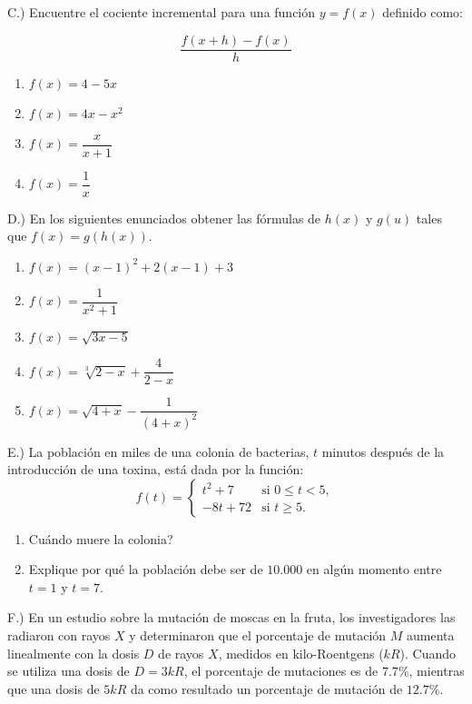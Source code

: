 \documentclass[]{book}
\providecommand{\tightlist}{%
  \setlength{\itemsep}{0pt}\setlength{\parskip}{0pt}}
\theoremstyle{definition}
\theoremstyle{definition}
\theoremstyle{definition}
\theoremstyle{remark}
\begin{document}
C.) Encuentre el cociente incremental para una función \(y=f(x)\) definido como:

\[
\dfrac{f(x+h)-f(x)}{h}
\]

\begin{enumerate}
\def\labelenumi{\alph{enumi}.}
\tightlist
\item
  \(f(x)=4-5x\)
\item
  \(f(x)=4x-x^{2}\)
\item
  \(f(x)=\dfrac{x}{x+1}\)
\item
  \(f(x)=\dfrac{1}{x}\)
\end{enumerate}

D.) En los siguientes enunciados obtener las fórmulas de \(h(x)\) y \(g(u)\) tales que \(f(x)=g(h(x))\).

\begin{enumerate}
\def\labelenumi{\alph{enumi}.}
\item
  \(f(x)=(x-1)^{2}+2(x-1)+3\)
\item
  \(f(x)=\dfrac{1}{x^{2}+1}\)
\item
  \(f(x)=\sqrt{3x-5}\)
\item
  \(f(x)=\sqrt[3]{2-x}+\dfrac{4}{2-x}\)
\item
  \(f(x)=\sqrt{4+x}-\dfrac{1}{(4+x)^{2}}\)
\end{enumerate}

E.) La población en miles de una colonia de bacterias, \(t\) minutos después de la introducción de una toxina, está dada por la función:
\[
f(t)=\begin{cases}
t^{2}+7 & \text{si $0 \leqslant t < 5$},\\
-8t+72 & \text{si $t \geq 5$}.
\end{cases} 
\]

\begin{enumerate}
\def\labelenumi{\alph{enumi}.}
\tightlist
\item
  Cuándo muere la colonia?
\item
  Explique por qué la población debe ser de \(10.000\) en algún momento entre \(t=1\) y \(t=7\).
\end{enumerate}

F.) En un estudio sobre la mutación de moscas en la fruta, los investigadores las radiaron con rayos \(X\) y determinaron que el porcentaje de mutación \(M\) aumenta linealmente con la dosis \(D\) de rayos \(X\), medidos en kilo-Roentgens (\(kR\)). Cuando se utiliza una dosis de \(D=3kR\), el porcentaje de mutaciones es de \(7.7 \%\), mientras que una dosis de \(5kR\) da como resultado un porcentaje de mutación de \(12.7 \%\).
\end{document}
